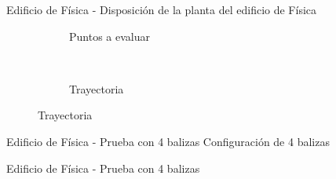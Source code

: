 \documentclass{beamer}
\begin{document}
  \begin{frame}{Edificio de Física - Disposición de la planta del edificio de Física}
    \begin{figure}[H]
      \begin{subfigure}[b]{.42\textwidth}
        \centering
        \def\svgwidth{\linewidth}
         
        \caption{Puntos a evaluar}
        \label{fig:puntos_fisica}
      \end{subfigure}
      ~~
      \begin{subfigure}[b]{.42\textwidth}
        \centering
        \def\svgwidth{\linewidth}
         
        \caption{Trayectoria}
        \label{fig:trayecto_fisica}
      \end{subfigure}
      \label{fig:fisica}
    \end{figure}
  \end{frame}

  \begin{frame}{Edificio de Física - Prueba con 4 balizas}
    Configuración de 4 balizas
    \begin{figure}[H]
      \centering
      \def\svgwidth{0.5\linewidth}
       
      \label{fig:sensores_fisica_4}
    \end{figure}
  \end{frame}
  
  \begin{frame}{Edificio de Física - Prueba con 4 balizas}
    \begin{figure}[H]
      \centering
      \scalebox{0.6}{}
      \label{fig:res_fisica_4}
    \end{figure}
  \end{frame}
  
\end{document}
